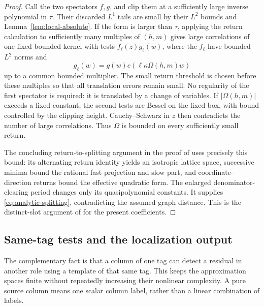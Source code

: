 \begin{proof}
Call the two spectators \(f,g\), and clip them at a sufficiently large inverse polynomial
in \(\tau\).  Their discarded \(L^1\) tails are small by their
\(L^2\) bounds and Lemma~\ref{lem:local-absolute}.  If the form is
larger than \(\tau\), applying the return calculation to sufficiently
many multiples of \((h,m)\) gives large correlations of one fixed
bounded kernel with tests \(f_\ell(z)g_\ell(w)\), where the
\(f_\ell\) have bounded \(L^2\) norms and
\[
 g_\ell(w)=g(w)e(\ell\kappa\Omega(h,m)w)
\]
up to a common bounded multiplier.  The small return threshold is
chosen before these multiples so that all translation errors remain
small.  No regularity of the first spectator is required: it is
translated by a change of variables.  If \(|\Omega(h,m)|\) exceeds
a fixed constant, the second tests are Bessel on the fixed box,
with bound controlled by the clipping height.  Cauchy--Schwarz in
\(z\) then contradicts the number of large correlations.  Thus
\(\Omega\) is bounded on every sufficiently small return.

The concluding return-to-splitting argument in the proof of
\cite[Lemma~4.3]{H} uses precisely this bound: its alternating
return identity yields an isotropic lattice space, successive
minima bound the rational fast projection and slow part, and
coordinate-direction returns bound the effective quadratic form.
The enlarged denominator-clearing period changes only its
quasipolynomial constants.  It supplies
\eqref{eq:analytic-splitting}, contradicting the assumed graph
distance.  This is the distinct-slot argument of
\cite[Lemma~6.1]{H} for the present coefficients.
\end{proof}

\subsection{Same-tag tests and the localization output}

The complementary fact is that a column of one tag can detect a
residual in another role using a template of that same tag.  This
keeps the approximation spaces finite without repeatedly increasing
their nonlinear complexity.  A pure source column means one scalar
column label, rather than a linear combination of labels.

